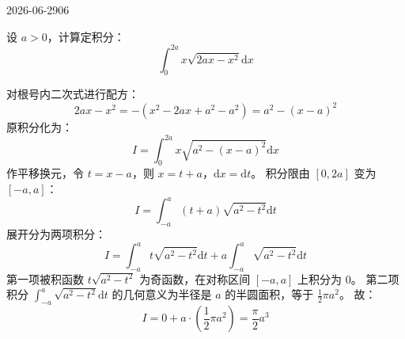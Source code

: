\begin{mistake}{2026-06-29}{06}

\begin{problemcontent}
设 \(a > 0\)，计算定积分：
\[
\int_0^{2a} x \sqrt{2ax - x^2} \mathrm{d}x
\]
\end{problemcontent}

\begin{solutioncontent}
对根号内二次式进行配方：
\[
2ax - x^2 = -(x^2 - 2ax + a^2 - a^2) = a^2 - (x-a)^2
\]
原积分化为：
\[
I = \int_0^{2a} x \sqrt{a^2 - (x-a)^2} \mathrm{d}x
\]
作平移换元，令 \(t = x - a\)，则 \(x = t + a\)，\(\mathrm{d}x = \mathrm{d}t\)。
积分限由 \([0, 2a]\) 变为 \([-a, a]\)：
\[
I = \int_{-a}^{a} (t + a) \sqrt{a^2 - t^2} \mathrm{d}t
\]
展开分为两项积分：
\[
I = \int_{-a}^{a} t \sqrt{a^2 - t^2} \mathrm{d}t + a \int_{-a}^{a} \sqrt{a^2 - t^2} \mathrm{d}t
\]
第一项被积函数 \(t \sqrt{a^2 - t^2}\) 为奇函数，在对称区间 \([-a, a]\) 上积分为 \(0\)。
第二项积分 \(\int_{-a}^{a} \sqrt{a^2 - t^2} \mathrm{d}t\) 的几何意义为半径是 \(a\) 的半圆面积，等于 \(\frac{1}{2}\pi a^2\)。
故：
\[
I = 0 + a \cdot \left( \frac{1}{2} \pi a^2 \right) = \frac{\pi}{2} a^3
\]
\end{solutioncontent}


\end{mistake}
